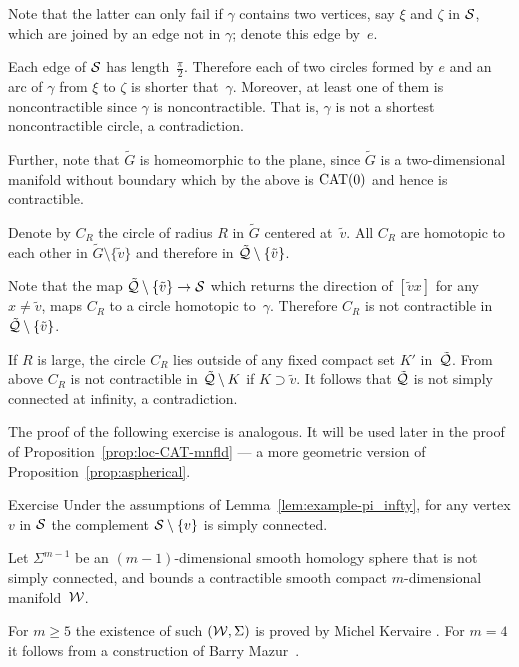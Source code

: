 Note that the latter can only fail if $\gamma$ contains two vertices, say $\xi$ 
and 
$\zeta$ in $\mathcal{S}$,
which are joined by an edge not in $\gamma$; 
denote this edge by~$e$.

Each edge of $\mathcal{S}$ has length~$\tfrac\pi2$.
Therefore each of two circles formed by $e$ and an arc of $\gamma$
from $\xi$ to $\zeta$ is shorter that~$\gamma$.
Moreover,
at least one of them is noncontractible 
since $\gamma$ is 
noncontractible.
That is, 
$\gamma$ is not a shortest noncontractible circle, a contradiction.
\claimqeds

Further, note that 
$\tilde G$ is homeomorphic to the plane, 
since $\tilde G$ is 
a two-dimensional manifold without boundary which 
by the above is $\mathrm{CAT}(0)$ and hence is contractible.

Denote by $C_R$ the circle of radius $R$ in $\tilde G$ centered at~$\tilde v$.
All $C_R$ are homotopic to each other in $\tilde G\setminus\{\tilde v\}$ and therefore in $\tilde{\mathcal{Q}}\setminus \{\tilde v\}$.

Note that the map $\tilde{\mathcal{Q}}\setminus \{\tilde v\}\to \mathcal{S}$
which returns the direction of $[{\tilde v}{x}]$  for any $x\ne \tilde v$, maps $C_R$ to a circle homotopic to~$\gamma$.
Therefore $C_R$ is not contractible in $\tilde{\mathcal{Q}}\setminus \{\tilde v\}$.

If $R$ is large, 
the circle $C_R$  
lies outside of any fixed compact set $K'$ in~$\tilde{\mathcal{Q}}$.
From above $C_R$ is not contractible in $\tilde{\mathcal{Q}}\setminus K$
if $K\supset \tilde v$.
It follows that $\tilde{\mathcal{Q}}$ is not simply connected at infinity, a contradiction.
\qeds

The proof of the following exercise is analogous.
It will be used later in the proof of Proposition~\ref{prop:loc-CAT-mnfld} --- a more geometric version of Proposition~\ref{prop:aspherical}.

\begin{thm}{Exercise}\label{ex:example-pi_infty-new}
Under the assumptions of Lemma~\ref{lem:example-pi_infty}, 
for any vertex $v$ in $\mathcal{S}$
the complement $\mathcal{S}\setminus\{v\}$ is simply connected.
\end{thm}

Let $\Sigma^{m-1}$ be an $(m-1)$-dimensional smooth homology sphere that  is not simply connected, and bounds a contractible smooth compact $m$-dimensional manifold~$\mathcal{W}$. 

For $m\ge 5$ the existence of such $(\mathcal{W}, \Sigma)$
is proved by Michel Kervaire \cite{kervaire}. 
For $m=4$ it follows from a construction of Barry Mazur~\cite{mazur}.

